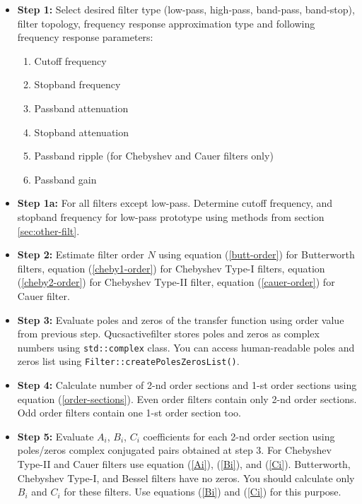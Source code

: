 \begin{itemize}
 \item \textbf{Step 1:} Select desired filter type (low-pass, high-pass,
band-pass, band-stop), filter topology, frequency response approximation type
and following frequency response parameters:
\begin{enumerate}
 \item Cutoff frequency
 \item Stopband frequency
 \item Passband attenuation
 \item Stopband attenuation
 \item Passband ripple (for Chebyshev and Cauer filters only)
 \item Passband gain
\end{enumerate}

\item \textbf{Step 1a:} For all filters except low-pass. Determine cutoff
 frequency, and stopband frequency for low-pass prototype using methods from
section \ref{sec:other-filt}. 

\item \textbf{Step 2:} Estimate filter order $N$ using equation
(\ref{butt-order}) for Butterworth filters, equation (\ref{cheby1-order}) for
Chebyshev Type-I filters, equation (\ref{cheby2-order}) for Chebyshev Type-II
filter, equation (\ref{cauer-order}) for Cauer filter.

\item \textbf{Step 3:} Evaluate poles and zeros of the transfer function using
order value from previous step. Qucsactivefilter stores poles and zeros as
complex numbers using \verb|std::complex| class. You can access human-readable
poles and zeros list using \verb|Filter::createPolesZerosList()|.

\item \textbf{Step 4:} Calculate number of 2-nd order sections and 1-st order
sections using equation (\ref{order-sections}). Even order filters contain only
2-nd order sections. Odd order filters contain one 1-st order section too.

\item \textbf{Step 5:} Evaluate $A_i$, $B_i$, $C_i$ coefficients for each 2-nd
order section using poles/zeros complex conjugated pairs obtained at step 3.
For Chebyshev Type-II and Cauer filters use equation (\ref{Ai}), (\ref{Bi}),
and (\ref{Ci}). Butterworth, Chebyshev Type-I, and Bessel filters have no
zeros. You should calculate only $B_i$ and $C_i$ for these filters. Use
equations (\ref{Bi}) and (\ref{Ci}) for this purpose.


\end{itemize}
